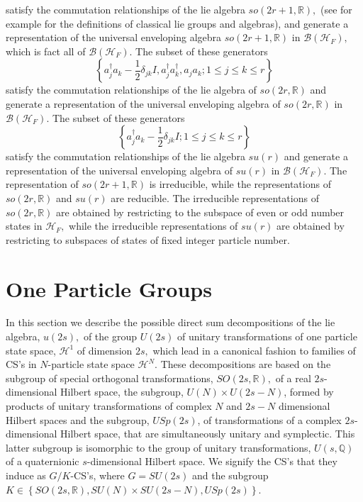 \documentclass[aps,preprint]{revtex4}%
\begin{document}
satisfy the commutation relationships of the lie algebra $so\left(
2r+1,\mathbb{R}\right)  ,$ (see \cite{gilmore} for example for the definitions
of classical lie groups and algebras), and generate a representation of the
universal enveloping algebra $so\left(  2r+1,\mathbb{R}\right)  $ in
$\mathcal{B}\left(  \mathcal{H}_{F}\right)  ,$ which is fact all of
$\mathcal{B}\left(  \mathcal{H}_{F}\right)  .$ The subset of these generators
\begin{equation}
\left\{  a_{j}^{\dagger}a_{k}-\frac{1}{2}\delta_{jk}I,a_{j}^{\dagger}%
a_{k}^{\dagger},a_{j}a_{k};1\leq j\leq k\leq r\right\}
\end{equation}
satisfy the commutation relationships of the lie algebra of $so\left(
2r,\mathbb{R}\right)  $ and generate a representation of the universal
enveloping algebra of $so\left(  2r,\mathbb{R}\right)  $ in $\mathcal{B}%
\left(  \mathcal{H}_{F}\right)  .$ The subset of these generators
\begin{equation}
\left\{  a_{j}^{\dagger}a_{k}-\frac{1}{2}\delta_{jk}I;1\leq j\leq k\leq
r\right\}
\end{equation}
satisfy the commutation relationships of the lie algebra $su\left(  r\right)
$ and generate a representation of the universal enveloping algebra of
$su\left(  r\right)  $ in $\mathcal{B}\left(  \mathcal{H}_{F}\right)  $. The
representation of $so\left(  2r+1,\mathbb{R}\right)  $ is irreducible, while
the representations of $so\left(  2r,\mathbb{R}\right)  $ and $su\left(
r\right)  $ are reducible. The irreducible representations of $so\left(
2r,\mathbb{R}\right)  $ are obtained by restricting to the subspace of even or
odd number states in $\mathcal{H}_{F},$ while the irreducible representations
of $su\left(  r\right)  $ are obtained by restricting to subspaces of states
of fixed integer particle number.

\section{One Particle Groups \label{one particle groups}}

In this section we describe the possible direct sum decompositions of the lie
algebra, $u(2s),$ of the group $U(2s)$ of unitary transformations of one
particle state space, $\mathcal{H}^{1}$ of dimension $2s,$ which lead in a
canonical fashion to families of CS's in $N$-particle state space
$\mathcal{H}^{N}$. These decompositions are based on the subgroup of special
orthogonal transformations, $SO\left(  2s,\mathbb{R}\right)  ,$ of a real
$2s$-dimensional Hilbert space, the subgroup, $U\left(  N\right)  \times
U\left(  2s-N\right)  $, formed by products of unitary transformations of
complex $N$ and $2s-N$ dimensional Hilbert spaces and the subgroup,
$USp\left(  2s\right)  $, of transformations of a complex $2s$-dimensional
Hilbert space, that are simultaneously unitary and symplectic. This latter
subgroup is isomorphic to the group of unitary transformations, $U\left(
s,\mathbb{Q}\right)  $ of a quaternionic $s$-dimensional Hilbert space. We
signify the CS's that they induce as $G/K$-CS's, where $G=SU\left(  2s\right)
$ and the subgroup $K\in\left\{  SO\left(  2s,\mathbb{R}\right)  ,SU\left(
N\right)  \times SU\left(  2s-N\right)  ,USp\left(  2s\right)  \right\}  $.
\end{document}
